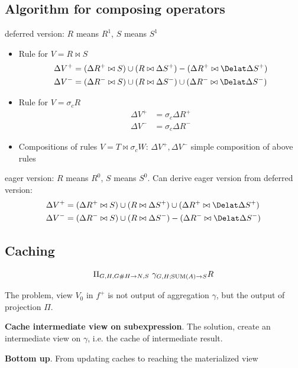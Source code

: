 \documentclass[a4paper]{report}
\begin{document}
\subsection{Algorithm for composing operators}
deferred version: $R$ means $R^1$, $S$ means $S^1$
\begin{itemize}
\item Rule for $V = R \bowtie S$
\begin{align*}
\Delta V^+ &= (\Delta R^+ \bowtie S) \cup (R \bowtie \Delta S^+) - (\Delta R^+ \bowtie \Delat \Delta S^+)\\
\Delta V^- &= (\Delta R^- \bowtie S) \cup (R \bowtie \Delta S^-) \cup (\Delta R^- \bowtie \Delat \Delta S^-)
\end{align*}
\item Rule for $V = \sigma_c R$
\begin{align*}
\Delta V^+ &= \sigma_c \Delta R^+\\
\Delta V^- &= \sigma_c \Delta R^-
\end{align*}
\item Compositions of rules $V = T\bowtie \sigma_c W$: $\Delta V^+, \Delta V^-$ simple composition of above rules 
\end{itemize}
eager version: $R$ means $R^0$, $S$ means $S^0$. Can derive eager version from deferred version:
\begin{align*}
\Delta V^+ &= (\Delta R^+ \bowtie S) \cup (R \bowtie \Delta S^+) \cup (\Delta R^+ \bowtie
\Delat \Delta S^+)\\
\Delta V^- &= (\Delta R^- \bowtie S) \cup (R \bowtie \Delta S^-) - (\Delta R^- \bowtie
\Delat \Delta S^-)
\end{align*}
\subsection{Caching}
\begin{align*}
\Pi_{G, H, G\#H\rightarrow N, S}\ \gamma_{G, H; \text{SUM}(A) \rightarrow S} R
\end{align*}

The problem, view $V_0$ in $f^+$ is not output of aggregation $\gamma$, but the output of projection $\Pi$. 

\textbf{Cache intermediate view on subexpression}. The solution, create an intermediate view on $\gamma$, i.e. the cache of intermediate result.

\textbf{Bottom up}. From updating caches to reaching the materialized view
\end{document}

